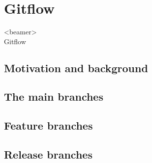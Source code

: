 \documentclass[usenames,svgnames,14pt]{beamer}
\begin{document}
\section{Gitflow}
\begin{frame}<beamer>{\\ \colorbox{PP}{}\;Gitflow}
    \vspace{3mm}
    \tableofcontents[sections={5}, currentsection, currentsubsection, hideothersubsections, sectionstyle=hide]
\end{frame}
\subsection{Motivation and background}
\begin{frame}{}

\end{frame}
\subsection{The main branches}
\begin{frame}{}

\end{frame}
\subsection{Feature branches}
\begin{frame}{}

\end{frame}
\subsection{Release branches}
\begin{frame}{}

\end{frame}
\end{document}
